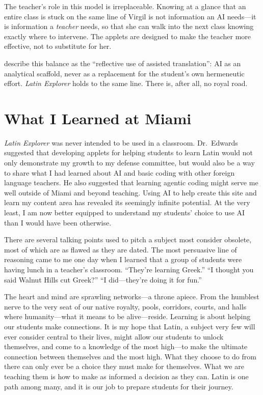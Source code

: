 \documentclass[11pt, a4paper]{article}
\begin{document}
The teacher's role in this model is irreplaceable. Knowing at a glance
that an entire class is stuck on the same line of Virgil is not information
an AI needs---it is information a \textit{teacher} needs, so that she can
walk into the next class knowing exactly where to intervene. The applets
are designed to make the teacher more effective, not to substitute for her.

\textcite{Colace2025} describe this balance as the ``reflective use of
assisted translation'': AI as an analytical scaffold, never as a replacement
for the student's own hermeneutic effort. \textit{Latin Explorer} holds to
the same line. There is, after all, no royal road.

\section{What I Learned at Miami}

\textit{Latin Explorer} was never intended to be used in a classroom. Dr.\
Edwards suggested that developing applets for helping students to learn
Latin would not only demonstrate my growth to my defense committee, but
would also be a way to share what I had learned about AI and basic coding
with other foreign language teachers. He also suggested that learning
agentic coding might serve me well outside of Miami and beyond teaching.
Using AI to help create this site and learn my content area has revealed its
seemingly infinite potential. At the very least, I am now better equipped to
understand my students' choice to use AI than I would have been otherwise.

There are several talking points used to pitch a subject most consider
obsolete, most of which are as flawed as they are dated. The most persuasive
line of reasoning came to me one day when I learned that a group of students
were having lunch in a teacher's classroom. ``They're learning Greek.''
``I thought you said Walnut Hills cut Greek?'' ``I did---they're doing it for
fun.''

The heart and mind are sprawling networks---a throne apiece. From the
humblest nerve to the very seat of our native royalty, pools, corridors,
courts, and halls where humanity---what it means to be alive---reside.
Learning is about helping our students make connections. It is my hope that
Latin, a subject very few will ever consider central to their lives, might
allow our students to unlock themselves, and come to a knowledge of the most
high---to make the ultimate connection between themselves and the most high.
What they choose to do from there can only ever be a choice they must make
for themselves. What we are teaching them is how to make as informed a
decision as they can. Latin is one path among many, and it is our job to
prepare students for their journey.

\printbibliography
\end{document}
